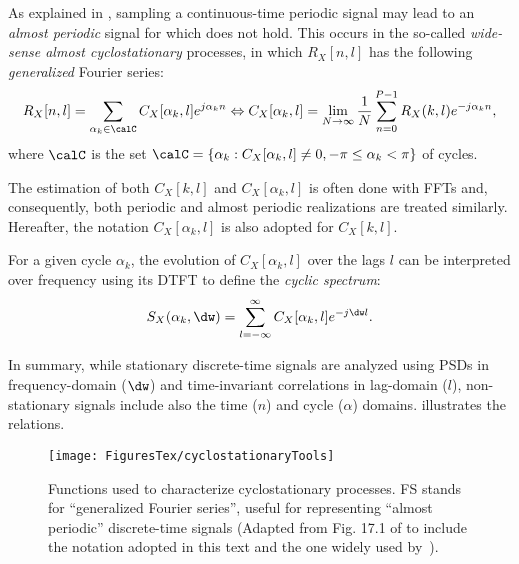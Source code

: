 As explained in \cite{Giannakis99}, sampling a continuous-time periodic signal may lead to an \emph{almost periodic} signal for which  does not hold. This occurs in 
the so-called \emph{wide-sense almost cyclostationary} processes, in which $R_{X}[n,l]$ has the following
\emph{generalized} Fourier series:
\begin{equation}
R_{X}[n,l] = \sum_{\alpha_k \in \calC} C_X[\alpha_k,l] e^{j \alpha_k n} \Leftrightarrow 
C_{X}[\alpha_k,l] = \lim_{N \rightarrow \infty} \frac{1}{N}\sum_{n=0}^{P-1} R_X(k,l) e^{-j \alpha_k n},
\label{eq:cycloGeneralizedDTFS}
\end{equation}
where $\calC$ is the set $\calC = \{\alpha_k: C_{X}[\alpha_k,l] \ne 0, -\pi \le \alpha_k < \pi\}$ of cycles.

The estimation of both $C_{X}[k,l]$ and $C_{X}[\alpha_k,l]$ is often done with FFTs and, consequently, both periodic and almost periodic realizations are treated similarly.
Hereafter, the notation $C_{X}[\alpha_k,l]$ is also adopted for $C_{X}[k,l]$.

For a given cycle $\alpha_k$, the evolution of $C_{X}[\alpha_k,l]$ over the lags $l$ can be
interpreted over frequency using its DTFT to define the \emph{cyclic spectrum}:
\begin{equation}
S_{X}(\alpha_k,\dw) = \sum_{l=-\infty}^{\infty} C_X[\alpha_k,l] e^{-j \dw l}.
\label{eq:cyclicSpectrum}
\end{equation}

In summary, while stationary discrete-time signals are analyzed using PSDs in frequency-domain 
($\dw$) and time-invariant correlations in lag-domain ($l$), non-stationary signals include
also the time ($n$) and cycle ($\alpha$) domains.
 illustrates the relations.

\begin{figure}[htbp]
\centering
\texttt{[image: FiguresTex/cyclostationaryTools]}
\caption[Functions used to characterize cyclostationary processes.]{Functions used to characterize cyclostationary processes. FS stands for ``generalized Fourier series'', useful
for representing ``almost periodic'' discrete-time signals (Adapted from Fig. 17.1 of \cite{Giannakis99} to include the notation adopted in this text and the one widely used by~\cite{Gardner91}).\label{fig:cyclostationaryTools}}
\end{figure}

